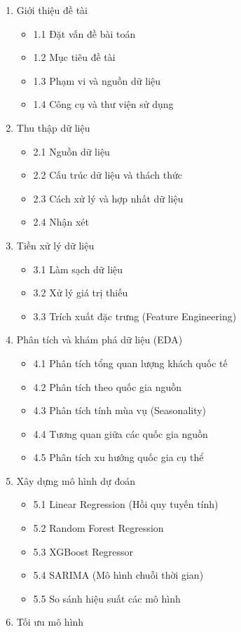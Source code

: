 \documentclass[11pt]{article}
\providecommand{\tightlist}{%
      \setlength{\itemsep}{0pt}\setlength{\parskip}{0pt}}
\begin{document}
\begin{enumerate}
\def\labelenumi{\arabic{enumi}.}
\tightlist
\item
  Giới thiệu đề tài

  \begin{itemize}
  \tightlist
  \item
    1.1 Đặt vấn đề bài toán
  \item
    1.2 Mục tiêu đề tài
  \item
    1.3 Phạm vi và nguồn dữ liệu
  \item
    1.4 Công cụ và thư viện sử dụng
  \end{itemize}
\item
  Thu thập dữ liệu

  \begin{itemize}
  \tightlist
  \item
    2.1 Nguồn dữ liệu
  \item
    2.2 Cấu trúc dữ liệu và thách thức
  \item
    2.3 Cách xử lý và hợp nhất dữ liệu
  \item
    2.4 Nhận xét
  \end{itemize}
\item
  Tiền xử lý dữ liệu

  \begin{itemize}
  \tightlist
  \item
    3.1 Làm sạch dữ liệu
  \item
    3.2 Xử lý giá trị thiếu
  \item
    3.3 Trích xuất đặc trưng (Feature Engineering)
  \end{itemize}
\item
  Phân tích và khám phá dữ liệu (EDA)

  \begin{itemize}
  \tightlist
  \item
    4.1 Phân tích tổng quan lượng khách quốc tế
  \item
    4.2 Phân tích theo quốc gia nguồn
  \item
    4.3 Phân tích tính mùa vụ (Seasonality)
  \item
    4.4 Tương quan giữa các quốc gia nguồn
  \item
    4.5 Phân tích xu hướng quốc gia cụ thể
  \end{itemize}
\item
  Xây dựng mô hình dự đoán

  \begin{itemize}
  \tightlist
  \item
    5.1 Linear Regression (Hồi quy tuyến tính)
  \item
    5.2 Random Forest Regression
  \item
    5.3 XGBoost Regressor
  \item
    5.4 SARIMA (Mô hình chuỗi thời gian)
  \item
    5.5 So sánh hiệu suất các mô hình
  \end{itemize}
\item
  Tối ưu mô hình


\end{enumerate}
\end{document}
